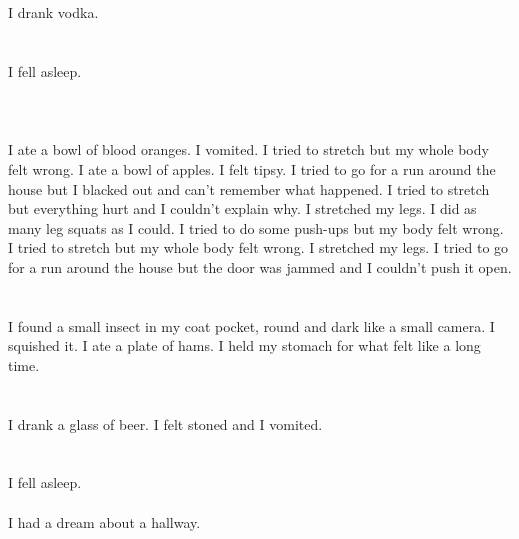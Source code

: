 \documentclass{article}
\begin{document}
    \section{}
    I drank vodka.  
    \newpage
    
    \section{}
    I fell asleep.\\\\ 
    \newpage
    
    \section{}
    I ate a bowl of blood oranges. I vomited. I tried to stretch but my whole body felt wrong. I ate a bowl of apples. I felt tipsy.  I tried to go for a run around the house but I blacked out and can't remember what happened.  I tried to stretch but everything hurt and I couldn't explain why.  I stretched my legs.  I did as many leg squats as I could.   I tried to do some push-ups but my body felt wrong.  I tried to stretch but my whole body felt wrong.  I stretched my legs.  I tried to go for a run around the house but the door was jammed and I couldn't push it open.  
    \newpage
    
    \section{}
    I found a small insect in my coat pocket, round and dark like a small camera. I squished it. I ate a plate of hams. I held my stomach for what felt like a long time.  
    \newpage
    
    \section{}
    I drank a glass of beer. I felt stoned and I vomited.  
    \newpage
    
    \section{}
    I fell asleep.\\\\I had a dream about a hallway.\\\\ 
    \newpage
    
\end{document}

